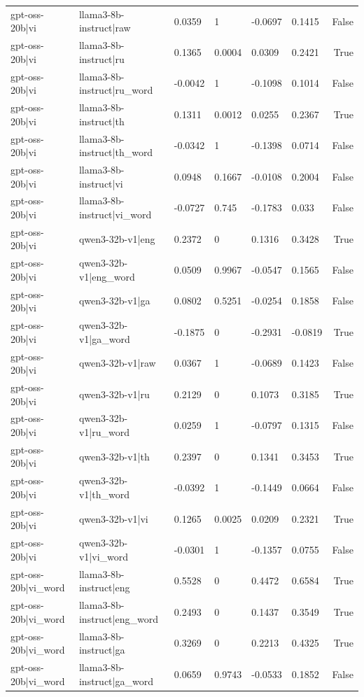 \begin{table}
\begin{tabular}{llllllr}
gpt-oss-20b|vi & llama3-8b-instruct|raw & 0.0359 & 1 & -0.0697 & 0.1415 & False \\
gpt-oss-20b|vi & llama3-8b-instruct|ru & 0.1365 & 0.0004 & 0.0309 & 0.2421 & True \\
gpt-oss-20b|vi & llama3-8b-instruct|ru_word & -0.0042 & 1 & -0.1098 & 0.1014 & False \\
gpt-oss-20b|vi & llama3-8b-instruct|th & 0.1311 & 0.0012 & 0.0255 & 0.2367 & True \\
gpt-oss-20b|vi & llama3-8b-instruct|th_word & -0.0342 & 1 & -0.1398 & 0.0714 & False \\
gpt-oss-20b|vi & llama3-8b-instruct|vi & 0.0948 & 0.1667 & -0.0108 & 0.2004 & False \\
gpt-oss-20b|vi & llama3-8b-instruct|vi_word & -0.0727 & 0.745 & -0.1783 & 0.033 & False \\
gpt-oss-20b|vi & qwen3-32b-v1|eng & 0.2372 & 0 & 0.1316 & 0.3428 & True \\
gpt-oss-20b|vi & qwen3-32b-v1|eng_word & 0.0509 & 0.9967 & -0.0547 & 0.1565 & False \\
gpt-oss-20b|vi & qwen3-32b-v1|ga & 0.0802 & 0.5251 & -0.0254 & 0.1858 & False \\
gpt-oss-20b|vi & qwen3-32b-v1|ga_word & -0.1875 & 0 & -0.2931 & -0.0819 & True \\
gpt-oss-20b|vi & qwen3-32b-v1|raw & 0.0367 & 1 & -0.0689 & 0.1423 & False \\
gpt-oss-20b|vi & qwen3-32b-v1|ru & 0.2129 & 0 & 0.1073 & 0.3185 & True \\
gpt-oss-20b|vi & qwen3-32b-v1|ru_word & 0.0259 & 1 & -0.0797 & 0.1315 & False \\
gpt-oss-20b|vi & qwen3-32b-v1|th & 0.2397 & 0 & 0.1341 & 0.3453 & True \\
gpt-oss-20b|vi & qwen3-32b-v1|th_word & -0.0392 & 1 & -0.1449 & 0.0664 & False \\
gpt-oss-20b|vi & qwen3-32b-v1|vi & 0.1265 & 0.0025 & 0.0209 & 0.2321 & True \\
gpt-oss-20b|vi & qwen3-32b-v1|vi_word & -0.0301 & 1 & -0.1357 & 0.0755 & False \\
gpt-oss-20b|vi_word & llama3-8b-instruct|eng & 0.5528 & 0 & 0.4472 & 0.6584 & True \\
gpt-oss-20b|vi_word & llama3-8b-instruct|eng_word & 0.2493 & 0 & 0.1437 & 0.3549 & True \\
gpt-oss-20b|vi_word & llama3-8b-instruct|ga & 0.3269 & 0 & 0.2213 & 0.4325 & True \\
gpt-oss-20b|vi_word & llama3-8b-instruct|ga_word & 0.0659 & 0.9743 & -0.0533 & 0.1852 & False \\

\end{tabular}
\end{table}
